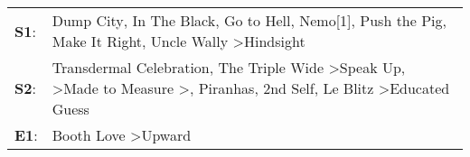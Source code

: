 \begin{supertabular}{p{0.03\textwidth}p{0.92\textwidth}}
 \textbf{S1}:  &                                                                                                                        Dump City\textsuperscript{}, \enspace In The Black\textsuperscript{}, \enspace Go to Hell\textsuperscript{}, \enspace Nemo[1]\textsuperscript{}, \enspace Push the Pig\textsuperscript{}, \enspace Make It Right\textsuperscript{}, \enspace Uncle Wally\textsuperscript{} \textgreater \enspace Hindsight\textsuperscript{}  \enspace  \\
 \textbf{S2}:  &  Transdermal Celebration\textsuperscript{}, \enspace The Triple Wide\textsuperscript{} \textgreater \enspace Speak Up\textsuperscript{}, \textsuperscript{} \textgreater \enspace Made to Measure\textsuperscript{} \textgreater {}\textsuperscript{}, \enspace Piranhas\textsuperscript{}, \enspace 2nd Self\textsuperscript{}, \enspace Le Blitz\textsuperscript{} \textgreater \enspace Educated Guess\textsuperscript{}  \enspace  \\
 \textbf{E1}:  &                                                                                                                                                                                                                                                                                                                                                                         Booth Love\textsuperscript{} \textgreater \enspace Upward\textsuperscript{}  \enspace  \\
\end{supertabular}

